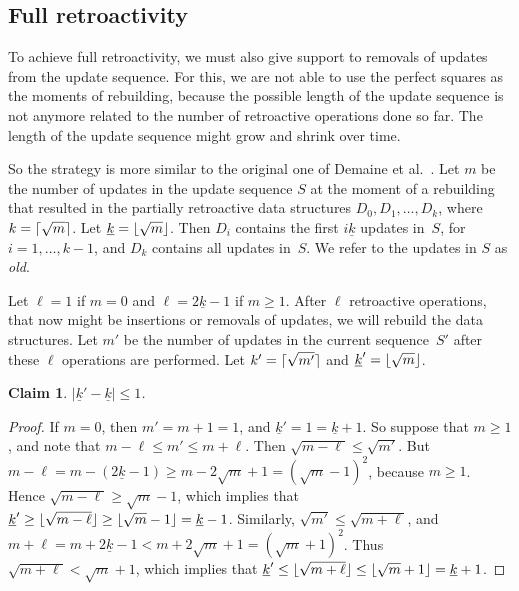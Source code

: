\documentclass[reqno,11pt]{amsart}
\DeclarePairedDelimiter\ceil{\lceil}{\rceil}
\DeclarePairedDelimiter\floor{\lfloor}{\rfloor}
\newtheorem{claim}	[theorem] {Claim}
\begin{document}
\subsection{Full retroactivity}\label{subsec:fully}

To achieve full retroactivity, 
we must also give support to removals of updates from the update sequence.  
For this, we are not able to use the perfect squares as the moments 
of rebuilding, because the possible length of the update sequence is
not anymore related to the number of retroactive operations done so far. 
The length of the update sequence might grow and shrink over time. 

So the strategy is more similar to the original one of Demaine et al.~\cite{DemaineIL2007}. 
Let $m$ be the number of updates in the update sequence $S$ at the
moment of a rebuilding that resulted in the partially retroactive 
data structures $D_0,D_1,\ldots,D_k$, where $k=\ceil{\sqrt{m}}$.
Let $\underline{k} = \floor{\sqrt{m}}$.
Then $D_i$ contains the first $i\underline{k}$ updates in~$S$, 
for $i=1,\ldots,k-1$, and $D_k$ contains all updates in~$S$. 
We refer to the updates in $S$ as \emph{old}.

Let $\ell=1$ if $m = 0$ and $\ell=2\underline{k}-1$ if $m \geq 1$. 
After $\ell$ retroactive operations, that now might be insertions 
or removals of updates, we will rebuild the data structures.
Let $m'$ be the number of updates in the current sequence~$S'$ 
after these $\ell$ operations are performed. 
Let $k'= \ceil{\sqrt{m'}}$ and $\underline{k}' = \floor{\sqrt{m}}$. 

\begin{claim}
  $|\underline{k}' - \underline{k}| \leq 1$.
\end{claim}
\begin{proof}
  If $m = 0$, then $m' = m + 1 = 1$, and $\underline{k}' = 1 = \underline{k}+1$.
  So suppose that $m \geq 1$, and note that $m-\ell \leq m' \leq m+\ell$.  
  Then $\sqrt{m-\ell} \leq \sqrt{m'}$.  
  But $m-\ell = m - (2\underline{k}-1) \geq m - 2\sqrt{m} + 1 = (\sqrt{m}-1)^2$, 
  because $m \geq 1$. 
  Hence $\sqrt{m-\ell} \geq \sqrt{m}-1$, 
  which implies that 
  $\underline{k}' \geq \floor{\sqrt{m-\ell}} \geq \floor{\sqrt{m}-1} = \underline{k}-1$. 
  Similarly, $\sqrt{m'} \leq \sqrt{m+\ell}$, and
  $m+\ell = m + 2\underline{k}-1 < m + 2\sqrt{m} + 1 = (\sqrt{m}+1)^2$. 
  Thus $\sqrt{m+\ell} < \sqrt{m}+1$, 
  which implies that 
  $\underline{k}' \leq \floor{\sqrt{m+\ell}} \leq \floor{\sqrt{m}+1} = \underline{k}+1$. 
\end{proof}
\end{document}
